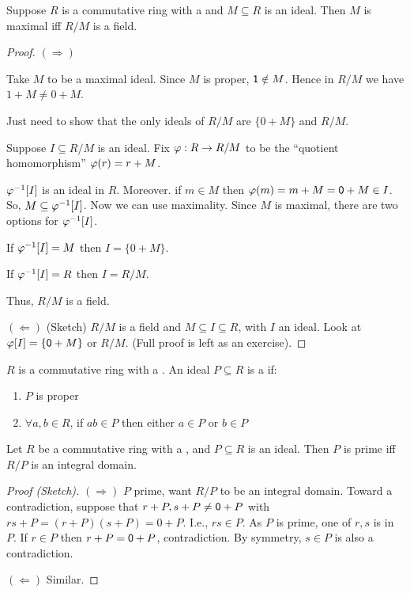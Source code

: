 \documentclass[notes.tex]{subfiles}
\begin{document}
\begin{proposition}
	Suppose $R$ is a commutative ring with a \one and $M\subseteq R$ is an ideal. Then $M$ is maximal iff $R/M$ is a field.
\end{proposition}
\begin{proof}
	$(\Longrightarrow)$

	Take $M$ to be a maximal ideal. Since $M$ is proper, $\mathsf{1}\notin M$. Hence in $R/M$ we have $1+M \ne 0+M$.

	Just need to show that the only ideals of $R/M$ are $\{0+M\}$ and $R/M$.

	Suppose $I\subseteq R/M$ is an ideal. Fix $\varphi:R\to R/M$ to be the ``quotient homomorphism'' $\varphi(r) = r+M$.

	${\varphi}^{-1}[I]$ is an ideal in $R$. Moreover. if $m\in M$ then $\varphi(m) = m+M = \mathsf{0} +M \in I$. So, $M\subseteq{\varphi}^{-1}[I]$. Now we can use maximality. Since $M$ is maximal, there are two options for ${\varphi}^{-1}[I]$.

	If ${\varphi}^{-1}[I] = M$ then $I = \{0+M\}$.

	If ${\varphi}^{-1}[I] = R$ then $I = R/M$.

	Thus, $R/M$ is a field.

	$(\Longleftarrow)$ (Sketch) $R/M$ is a field and $M\subseteq I \subseteq R$, with $I$  an ideal. Look at $\varphi[I] = \{\mathsf{0}+M\}$ or $R/M$. (Full proof is left as an exercise).
\end{proof}

\begin{defn}
	$R$ is a commutative ring with a \one. An ideal $P\subseteq R$ is a  if:
	\begin{enumerate}
		\item $P$ is proper
		\item $\forall a, b\in R$, if $ab\in P$ then either $a\in P$ or $b\in P$
	\end{enumerate}
\end{defn}

\begin{proposition}
	Let $R$ be a commutative ring with a \one, and $P\subseteq R$ is an ideal. Then $P$ is prime iff $R/P$ is an integral domain.
\end{proposition}
\begin{proof}[Proof (Sketch)]
	$(\Longrightarrow)$
	$P$ prime, want $R/P$ to be an integral domain.
	Toward a contradiction, suppose that $r+P, s+P\ne \mathsf{0} + P$ with $rs + P = (r+P)(s+P) = 0 + P$. I.e., $rs\in P$. As $P$ is prime, one of $r, s$ is in $P$. If $r\in P$ then $r+P = \mathsf{0} + P$, contradiction. By symmetry, $s\in P$ is also a contradiction.

	$(\Longleftarrow)$ Similar.
\end{proof}
\end{document}

